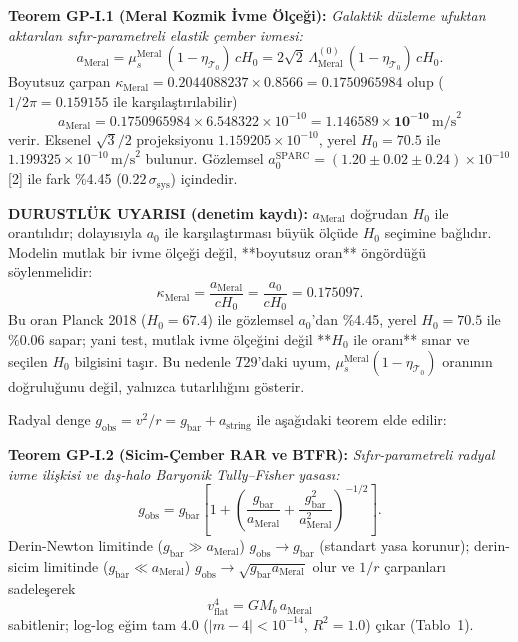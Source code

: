 \documentclass[12pt,a4paper]{article}
\begin{document}
\textbf{Teorem GP-I.1 (Meral Kozmik İvme Ölçeği):} \textit{Galaktik düzleme
ufuktan aktarılan sıfır-parametreli elastik çember ivmesi:}
\begin{equation}
\label{eq:ameral}
\boxed{a_{\mathrm{Meral}} = \mu_s^{\mathrm{Meral}}\,(1-\eta_{\mathcal{T}_0})\,cH_0
= 2\sqrt{2}\,\Lambda_{\mathrm{Meral}}^{(0)}\,(1-\eta_{\mathcal{T}_0})\,cH_0.}
\end{equation}
Boyutsuz çarpan
$\kappa_{\mathrm{Meral}} = 0.2044088237\times 0.8566 = 0.1750965984$ olup
($1/2\pi = 0.159155$ ile karşılaştırılabilir)
\begin{equation}
a_{\mathrm{Meral}} = 0.1750965984\times 6.548322\times 10^{-10}
= \mathbf{1.146589\times 10^{-10}}\,\mathrm{m/s}^2
\end{equation}
verir. Eksenel $\sqrt{3}/2$ projeksiyonu $1.159205\times 10^{-10}$,
yerel $H_0 = 70.5$ ile $1.199325\times 10^{-10}\,\mathrm{m/s}^2$ bulunur.
Gözlemsel $a_0^{\mathrm{SPARC}} = (1.20\pm 0.02\pm 0.24)\times 10^{-10}$ [2] ile
fark \%4.45 ($0.22\,\sigma_{\mathrm{sys}}$) içindedir.

\textbf{DURUSTLÜK UYARISI (denetim kaydı):} $a_{\mathrm{Meral}}$ doğrudan
$H_0$ ile orantılıdır; dolayısıyla $a_0$ ile karşılaştırması büyük ölçüde
$H_0$ seçimine bağlıdır. Modelin mutlak bir ivme ölçeği değil, **boyutsuz
oran** öngördüğü söylenmelidir:
$$\kappa_{\mathrm{Meral}}=\frac{a_{\mathrm{Meral}}}{cH_0}
=\frac{a_0}{cH_0}=0.175097 .$$
Bu oran Planck 2018 ($H_0=67.4$) ile gözlemsel $a_0$'dan \%4.45, yerel
$H_0=70.5$ ile \%0.06 sapar; yani test, mutlak ivme ölçeğini değil
**$H_0$ ile oranı** sınar ve seçilen $H_0$ bilgisini taşır. Bu nedenle
$T29$'daki uyum, $\mu_s^{\mathrm{Meral}}(1-\eta_{\mathcal{T}_0})$ oranının
doğruluğunu değil, yalnızca tutarlılığını gösterir.

Radyal denge $g_{\mathrm{obs}} = v^2/r = g_{\mathrm{bar}} + a_{\mathrm{string}}$
ile aşağıdaki teorem elde edilir:

\textbf{Teorem GP-I.2 (Sicim-Çember RAR ve BTFR):} \textit{Sıfır-parametreli
radyal ivme ilişkisi ve dış-halo Baryonik Tully--Fisher yasası:}
\begin{equation}
\label{eq:rar}
\boxed{g_{\mathrm{obs}} = g_{\mathrm{bar}}\left[1+\left(
\frac{g_{\mathrm{bar}}}{a_{\mathrm{Meral}}}
+\frac{g_{\mathrm{bar}}^2}{a_{\mathrm{Meral}}^2}\right)^{-1/2}\right].}
\end{equation}
Derin-Newton limitinde ($g_{\mathrm{bar}}\gg a_{\mathrm{Meral}}$)
$g_{\mathrm{obs}}\to g_{\mathrm{bar}}$ (standart yasa korunur); derin-sicim
limitinde ($g_{\mathrm{bar}}\ll a_{\mathrm{Meral}}$)
$g_{\mathrm{obs}}\to\sqrt{g_{\mathrm{bar}}a_{\mathrm{Meral}}}$ olur ve $1/r$
çarpanları sadeleşerek
\begin{equation}
\boxed{v_{\mathrm{flat}}^4 = GM_b\,a_{\mathrm{Meral}}}
\end{equation}
sabitlenir; log-log eğim tam $4.0$ ($|m-4|<10^{-14}$, $R^2 = 1.0$) çıkar (Tablo~1).
\end{document}
